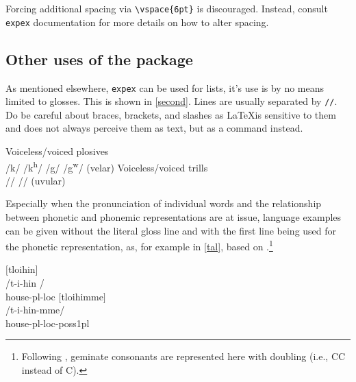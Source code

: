 Forcing additional spacing via \verb=\vspace{6pt}= is discouraged. Instead, consult \verb=expex= documentation for more details on how to alter spacing.

\subsection{Other uses of the package} 
As mentioned elsewhere, \verb=expex= can be used for lists, it's use is by no means limited to glosses. This is shown in \ref{second}. Lines are usually separated by \verb=//=. Do be careful about braces, brackets, and slashes as \LaTeX is sensitive to them and does not always perceive them as text, but as a command instead. 

\pex \label{second}
\a Voiceless/voiced plosives\\ /k/ /k\textsuperscript{h}/ /g/ /g\textsuperscript{w}/    (velar)
\a Voiceless/voiced trills\\ /\textscr/ /\textinvscr/ (uvular)
\xe

Especially when the pronunciation of individual words and the relationship between phonetic and phonemic representations are at issue, language examples can be given without the literal gloss line and with the first line being used for the phonetic representation, as, for example in \ref{tal}, based on \cite{Kiparsky_2003}.\footnote{Following \cite{Kiparsky_2003}, geminate consonants are represented here with doubling (i.e., CC instead of C\textipa{:}).}

\pex \label{tal}
\a $[$t{\textscripta}loihin$]$\\
\slash t{\textscripta}-i-hin \slash \\ 
house-{\sc pl}-{\sc loc}
\a $[$t{\textscripta}loihimme$]$\\
/t{\textscripta}-i-hin-mme/ \\
house-{\sc pl}-{\sc loc}-{\sc poss1pl}
\xe

